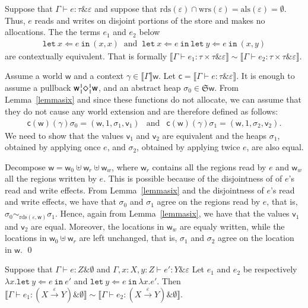 \documentclass[orivec]{llncs}
\newcommand{\keywd}[1]{\mathtt{#1}}
\newcommand{\sq}[4]{\tensor*[^{#1}_{#2}]{\Diamond}{^{#3}_{#4}}}
\newcommand{\effto}[1]{\stackrel{#1}{\to}}
\newcommand{\letin}[2]{\keywd{let}\:{#1}\!\Leftarrow\!{#2}\:\keywd{in}\:}
\newcommand{\rdsin}[1]{\mathrm{rds}({#1})}
\newcommand{\eff}{\varepsilon}
\newcommand{\reads}{\mathrm{rds}}
\newcommand{\writes}{\mathrm{wrs}}
\newcommand{\allocs}{\mathrm{als}}
\newcommand{\sem}[1]{\ensuremath{\llbracket {#1} \rrbracket}}
\renewenvironment{proof}{\vspace{-1mm} \noindent {\bf Proof}\quad}{\qed}
\newcommand\w{\ensuremath{\mathsf{w}}\xspace}
\newcommand{\Astores}{\mathfrak{S}}
\newcommand\val{\ensuremath{\mathsf{v}}\xspace}
\newcommand\cval{\ensuremath{\mathsf{c}}\xspace}
\newcommand{\ety}[2]{{#1}\mathrel{\&}{#2}}
\newcommand{\valty}[1]{#1}
\begin{document}
\begin{proposition}\label{dupl}
  Suppose that $\Gamma \vdash e:\ety{\tau}{\eff}$ and suppose
that
  $\reads(\eff)\cap\writes(\eff)=\allocs(\eff)=\emptyset$. Thus, $e$
  reads and writes on disjoint portions of the store and makes no
  allocations. The the terms  $e_1$ and $e_2$ below
\[\begin{array}{l}
\letin{x}{e}{(x,x)} ~\textrm{ and }~ \letin{x}{e} \letin{y}{e}{(x,y)}
\end{array}
\]
 are contextually equivalent. That is
formally $\sem{\Gamma \vdash e_1 : \ety{\tau \times \tau}{\eff}} \sim
\sem{\Gamma \vdash e_2 : \ety{\tau \times \tau}{\eff}}$.
\end{proposition}

\begin{proof}
Assume a world \w and a context $\gamma \in \sem{\Gamma}\w$.
Let $\cval = \sem{\Gamma \vdash e : \ety{\tau}{\eff}}$. 
It is enough to assume a pullback 
$\w \sq{1}{1}{1}{1} \w$, and an abstract heap $\sigma_0 \in
\Astores \w$. 
From Lemma~\ref{lemmasix} and since these functions do not allocate, we
can assume that they do not cause any world extension and are therefore
defined as follows:
\[
 \begin{array}{lcl}
 \cval(\w)(\gamma)\sigma_0  =  (\w, 1, \sigma_1, \val_1) &
\textrm{and}&
  \cval(\w)(\gamma)\sigma_1  =  (\w, 1, \sigma_2, \val_2).
 \end{array}
\]
We need to show that the values $\val_1$ and $\val_2$ are equivalent and 
the heaps $\sigma_1$, obtained by applying once $e$, and $\sigma_2$,
obtained by applying twice $e$, are also equal. 

Decompose $\w = \w_0 \uplus \w_r \uplus \w_w $, where $\w_r$ contains all
the regions read by $e$ and $\w_w$ all the regions written by $e$. This is
possible because of the disjointness of of $e$'s read and write effects. 
From Lemma~\ref{lemmasix} and the disjointness of  $e$'s read and write
effects, we have that $\sigma_0$ and $\sigma_1$ agree on the regions read
by $e$, that is, $\sigma_0 \sim_{\rdsin{\eff, \w}} \sigma_1$. Hence, again
from Lemma~\ref{lemmasix}, we have that the values $\val_1$ and $\val_2$
are equal. Moreover, the locations in $\w_w$ are equaly written, while the
locations in $\w_0 \uplus \w_r$ are left unchanged, that is,
$\sigma_1$ and $\sigma_2$ agree on the location in $\w$.
\end{proof}

\begin{proposition}\label{hoist}
Suppose that $
\Gamma\vdash e: \ety{Z}{\emptyset}$ and 
$\Gamma,x{:}X,y{:}Z\vdash e': \ety{Y}{\eff}$
Let $e_1$ and $e_2$ be respectively $
\lambda x.\letin{y}{e} {e'}$ and
$\letin{y}{e}{\lambda x.e'}$. 
Then $\sem{\Gamma\vdash  e_1 :
\ety{(\valty{X\effto\eff
Y})}{\emptyset}} \sim 
\sem{\Gamma\vdash  e_2 : \ety{(\valty{X\effto\eff
Y})}{\emptyset}}$.
\end{proposition}
\end{document}
